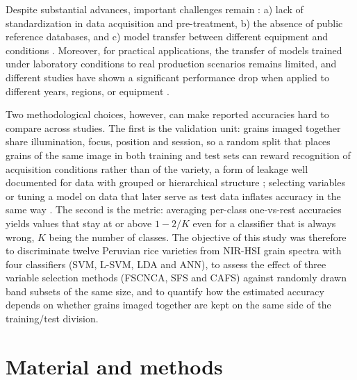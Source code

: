 \documentclass[final,5p,times,twocolumn]{elsarticle}
\newcommand{\added}[1]{{\color{blue}#1}}
\begin{document}

Despite substantial advances, \added{important challenges remain} \cite{Shi2025, Cazzaniga2026}: a) lack of standardization in data acquisition and pre-treatment, b) the absence of public reference databases, and c) model transfer between different equipment and conditions \cite{Shi2025,Vazquez2026, Dehbasteh2025}. 
\added{Moreover, for practical applications, the transfer of models trained under laboratory conditions to real production scenarios remains limited, and} different studies have shown a significant performance drop when applied to different years, regions, or equipment \cite{Tong2021, Sun2025, Onmarkhong2022}. 

\added{Two methodological choices, however, can make reported accuracies hard to compare across studies. The first is the validation unit: grains imaged together share illumination, focus, position and session, so a random split that places grains of the same image in both training and test sets can reward recognition of acquisition conditions rather than of the variety, a form of leakage well documented for data with grouped or hierarchical structure \citep{Roberts2017,Kaufman2012}; selecting variables or tuning a model on data that later serve as test data inflates accuracy in the same way \citep{Varma2006,Westerhuis2008}. The second is the metric: averaging per-class one-vs-rest accuracies yields values that stay at or above $1-2/K$ even for a classifier that is always wrong, $K$ being the number of classes.
The objective of this study was therefore to discriminate twelve Peruvian rice varieties from NIR-HSI grain spectra with four classifiers (SVM, L-SVM, LDA and ANN), to assess the effect of three variable selection methods (FSCNCA, SFS and CAFS) against randomly drawn band subsets of the same size, and to quantify how the estimated accuracy depends on whether grains imaged together are kept on the same side of the training/test division.}



\section{Material and methods}
\end{document}
